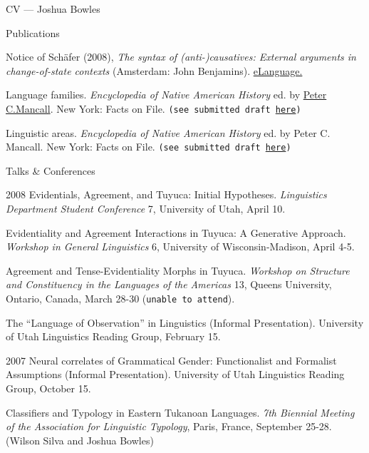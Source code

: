 \begin{cv}{CV --- Joshua Bowles}
\begin{cvlist}{Publications}
\item Notice of Sch\"afer (2008), \emph{The syntax of (anti-)causatives: External arguments in
change-of-state contexts} (Amsterdam: John Benjamins).
\href{http://www.elanguage.net/home.php}{eLanguage.}

\item Language families. \emph{Encyclopedia of Native American History} ed. by
\href{http://college.usc.edu/faculty/faculty1003494.html}{Peter C.Mancall}. New York: Facts on File.
\texttt{(see submitted draft
\href{http://sites.google.com/site/bowleslinguistics/Home/research/teaching-1/publications}{here})}

\item Linguistic areas. \emph{Encyclopedia of Native American History} ed. by Peter C. Mancall. New
York: Facts on File. \texttt{(see submitted draft
\href{http://sites.google.com/site/bowleslinguistics/Home/research/teaching-1/publications}{here})}
\end{cvlist}

\begin{cvlist}{Talks \& Conferences}
\item[2008] Evidentials, Agreement, and Tuyuca: Initial Hypotheses. \emph{Linguistics Department
Student Conference} 7, University of Utah, April 10.

\item Evidentiality and Agreement Interactions in Tuyuca: A Generative Approach.
\emph{Workshop in General Linguistics} 6, University of Wisconsin-Madison, April 4-5.

\item Agreement and Tense-Evidentiality Morphs in Tuyuca. \emph{Workshop on Structure
and Constituency in the Languages of the Americas} 13, Queens University,
Ontario, Canada, March 28-30 (\texttt{unable to attend}).

\item The ``Language of Observation'' in Linguistics (Informal Presentation). University of Utah
Linguistics Reading Group, February 15.
\item[2007] Neural correlates of Grammatical Gender: Functionalist and Formalist
Assumptions (Informal Presentation). University of Utah Linguistics Reading
Group, October 15.

\item Classifiers and Typology in Eastern Tukanoan Languages. \emph{7th Biennial Meeting of the
Association for Linguistic Typology}, Paris, France, September 25-28.
(Wilson Silva and Joshua Bowles)


\end{cvlist}
\end{cv}
